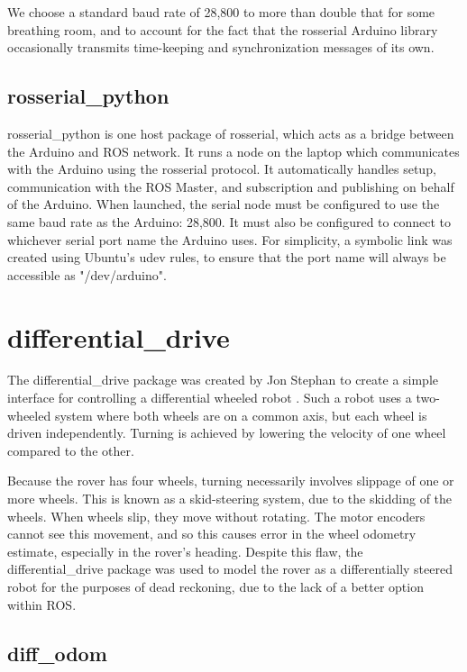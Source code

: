 We choose a standard baud rate of 28,800 to more than double that for some breathing room, and to account for the fact that the rosserial Arduino library occasionally transmits time-keeping and synchronization messages of its own.

\subsection{rosserial\_python}
rosserial\_python is one host package of rosserial, which acts as a bridge between the Arduino and ROS network. It runs a node on the laptop which communicates with the Arduino using the rosserial protocol. It automatically handles setup, communication with the ROS Master, and subscription and publishing on behalf of the Arduino. When launched, the serial node must be configured to use the same baud rate as the Arduino: 28,800. It must also be configured to connect to whichever serial port name the Arduino uses. For simplicity, a symbolic link was created using Ubuntu's udev rules, to ensure that the port name will always be accessible as "/dev/arduino". %

\section{differential\_drive}
The differential\_drive package was created by Jon Stephan to create a simple interface for controlling a differential wheeled robot \cite{differentialDrivePackage}. Such a robot uses a two-wheeled system where both wheels are on a common axis, but each wheel is driven independently. Turning is achieved by lowering the velocity of one wheel compared to the other.

Because the rover has four wheels, turning necessarily involves slippage of one or more wheels. This is known as a skid-steering system, due to the skidding of the wheels. When wheels slip, they move without rotating. The motor encoders cannot see this movement, and so this causes error in the wheel odometry estimate, especially in the rover's heading. Despite this flaw, the differential\_drive package was used to model the rover as a differentially steered robot for the purposes of dead reckoning, due to the lack of a better option within ROS.

\subsection{diff\_odom} \label{sectionOdomPublishing}

